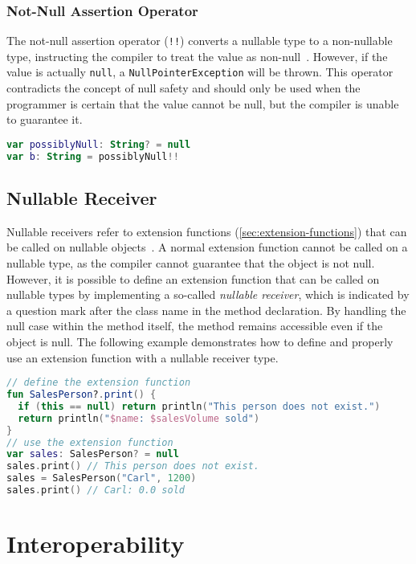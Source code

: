 \documentclass[a4paper,11pt]{article}
\begin{document}
\subsubsection{Not-Null Assertion Operator}
The not-null assertion operator (\texttt{!!}) converts a nullable type to a non-nullable type, instructing the compiler to treat the value as non-null~\cite{nullsafety-assertion}. However, if the value is actually \texttt{null}, a \texttt{NullPointerException} will be thrown.
This operator contradicts the concept of null safety and should only be used when the programmer is certain that the value cannot be null, but the compiler is unable to guarantee it.


\begin{lstlisting}[language=Kotlin, title={Usage of the not-null assertion}]
var possiblyNull: String? = null
var b: String = possiblyNull!!
\end{lstlisting}

\subsection{Nullable Receiver}
Nullable receivers refer to extension functions (\autoref{sec:extension-functions}) that can be called on nullable objects~\cite{nullsafety-nullable-receiver}. 
A normal extension function cannot be called on a nullable type, as the compiler cannot guarantee that the object is not null.
However, it is possible to define an extension function that can be called on nullable types by implementing a so-called \textit{nullable receiver}, which is indicated by a question mark after the class name in the method declaration. 
By handling the null case within the method itself, the method remains accessible even if the object is null.
The following example demonstrates how to define and properly use an extension function with a nullable receiver type.

\begin{lstlisting}[language=Kotlin,title={Usage of an extension function}]
// define the extension function
fun SalesPerson?.print() {
  if (this == null) return println("This person does not exist.")
  return println("$name: $salesVolume sold")
}
// use the extension function
var sales: SalesPerson? = null
sales.print() // This person does not exist.
sales = SalesPerson("Carl", 1200)
sales.print() // Carl: 0.0 sold
\end{lstlisting}

\section{Interoperability}
\end{document}
